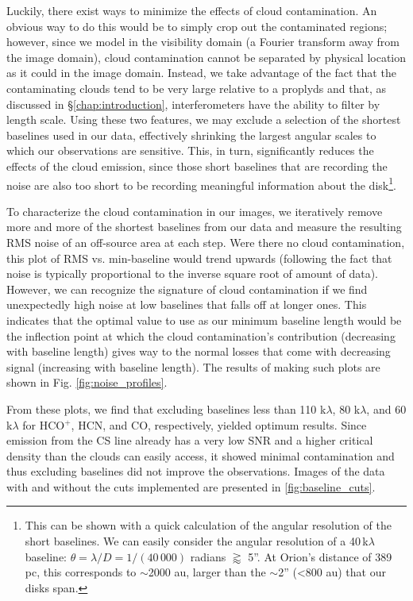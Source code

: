 Luckily, there exist ways to minimize the effects of cloud contamination. An obvious way to do this would be to simply crop out the contaminated regions; however, since we model in the visibility domain (a Fourier transform away from the image domain), cloud contamination cannot be separated by physical location as it could in the image domain. Instead, we take advantage of the fact that the contaminating clouds tend to be very large relative to a proplyds and that, as discussed in \S\ref{chap:introduction}, interferometers have the ability to filter by length scale. Using these two features, we may exclude a selection of the shortest baselines used in our data, effectively shrinking the largest angular scales to which our observations are sensitive. This, in turn, significantly reduces the effects of the cloud emission, since those short baselines that are recording the noise are also too short to be recording meaningful information about the disk\footnote{This can be shown with a quick calculation of the angular resolution of the short baselines. We can easily consider the angular resolution of a 40\,k$\lambda$ baseline: $\theta = \lambda/D = 1/(40\,000)$ radians $\gtrapprox$ 5''. At Orion's distance of 389 pc, this corresponds to $\sim$2000 au, larger than the $\sim$2'' (\textless800 au) that our disks span.}.


To characterize the cloud contamination in our images, we iteratively remove more and more of the shortest baselines from our data and measure the resulting RMS noise of an off-source area at each step. Were there no cloud contamination, this plot of RMS vs. min-baseline would trend upwards (following the fact that noise is typically proportional to the inverse square root of amount of data). However, we can recognize the signature of cloud contamination if we find unexpectedly high noise at low baselines that falls off at longer ones. This indicates that the optimal value to use as our minimum baseline length would be the inflection point at which the cloud contamination's contribution (decreasing with baseline length) gives way to the normal losses that come with decreasing signal (increasing with baseline length). The results of making such plots are shown in Fig. \ref{fig:noise_profiles}.

From these plots, we find that excluding baselines less than 110 k$\lambda$, 80 k$\lambda$, and 60  k$\lambda$ for HCO$^{+}$, HCN, and CO, respectively, yielded optimum results. Since emission from the CS line already has a very low SNR and a higher critical density than the clouds can easily access, it showed minimal contamination and thus excluding baselines did not improve the observations. Images of the data with and without the cuts implemented are presented in \ref{fig:baseline_cuts}.

